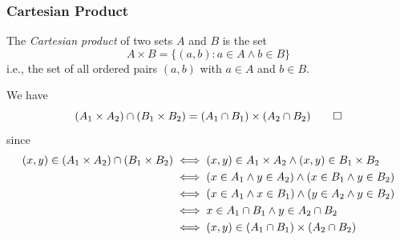 \subsubsection*{Cartesian Product}
\begin{definition}\label{def:cartesian-product}
The \emph{Cartesian product} of two sets $A$ and $B$ is the set
\[A \times B = \{(a,b) : a \in A \land b \in B\}\]
i.e., the set of all ordered pairs $(a,b)$ with $a \in A$ and $b \in B$.
\end{definition} 


We have
\begin{equation}\label{eq:intersection-of-product}
(A_1\times A_2)\cap(B_1\times B_2)
=
(A_1\cap B_1)\times(A_2\cap B_2)
\qedhere
\end{equation}
since
\[
\begin{aligned}
(x,y)\in (A_1\times A_2)\cap(B_1\times B_2)
&\iff (x,y)\in A_1\times A_2 \land (x,y)\in B_1\times B_2\\
&\iff (x\in A_1 \land y\in A_2)\land(x\in B_1 \land y\in B_2)\\
&\iff (x\in A_1 \land x\in B_1)\land(y\in A_2 \land y\in B_2)\\
&\iff x\in A_1\cap B_1 \land y\in A_2\cap B_2\\
&\iff \smash[b]{(x,y) \in (A_1\cap B_1)\times(A_2\cap B_2)}
\end{aligned}
\]




